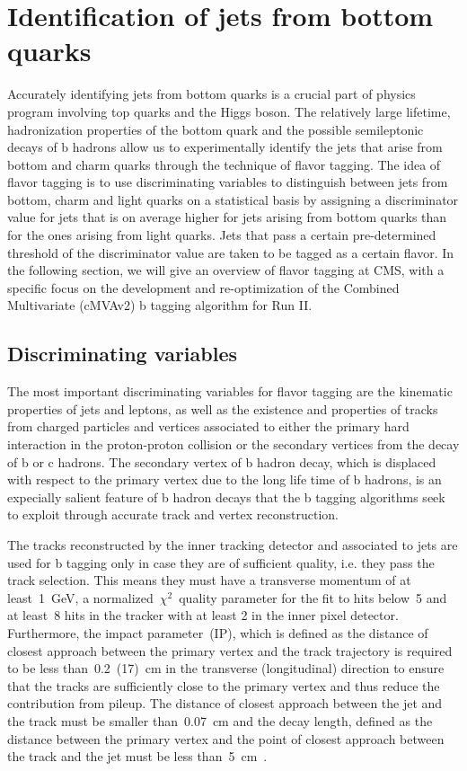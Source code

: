 \section{Identification of jets from bottom quarks}
Accurately identifying jets from bottom quarks is a crucial part of physics program involving top quarks and the Higgs boson. The relatively large lifetime, hadronization properties of the bottom quark and the possible semileptonic decays of b hadrons allow us to experimentally identify the jets that arise from bottom and charm quarks through the technique of flavor tagging. The idea of flavor tagging is to use discriminating variables to distinguish between jets from bottom, charm and light quarks on a statistical basis by assigning a discriminator value for jets that is on average higher for jets arising from bottom quarks than for the ones arising from light quarks. Jets that pass a certain pre-determined threshold of the discriminator value are taken to be tagged as a certain flavor. In the following section, we will give an overview of flavor tagging at CMS, with a specific focus on the development and re-optimization of the Combined Multivariate (cMVAv2) b tagging algorithm for Run II.

\subsection{Discriminating variables}
The most important discriminating variables for flavor tagging are the kinematic properties of jets and leptons, as well as the existence and properties of tracks from charged particles and vertices associated to either the primary hard interaction in the proton-proton collision or the secondary vertices from the decay of b or c hadrons. The secondary vertex of b hadron decay, which is displaced with respect to the primary vertex due to the long life time of b hadrons, is an expecially salient feature of b hadron decays that the b tagging algorithms seek to exploit through accurate track and vertex reconstruction. 

The tracks reconstructed by the inner tracking detector and associated to jets are used for b tagging only in case they are of sufficient quality, i.e. they pass the track selection. This means they must have a transverse momentum of at least~1~GeV, a normalized~$\chi^2$~quality parameter for the fit to hits below~5 and at least~8 hits in the tracker with at least 2 in the inner pixel detector. Furthermore, the impact parameter~(IP), which is defined as the distance of closest approach between the primary vertex and the track trajectory is required to be less than~0.2~(17)~cm in the transverse (longitudinal) direction to ensure that the tracks are sufficiently close to the primary vertex and thus reduce the contribution from pileup. The distance of closest approach between the jet and the track must be smaller than~0.07~cm and the decay length, defined as the distance between the primary vertex and the point of closest approach between the track and the jet must be less than~5~cm~\cite{CMS-PAS-BTV-15-001}.

